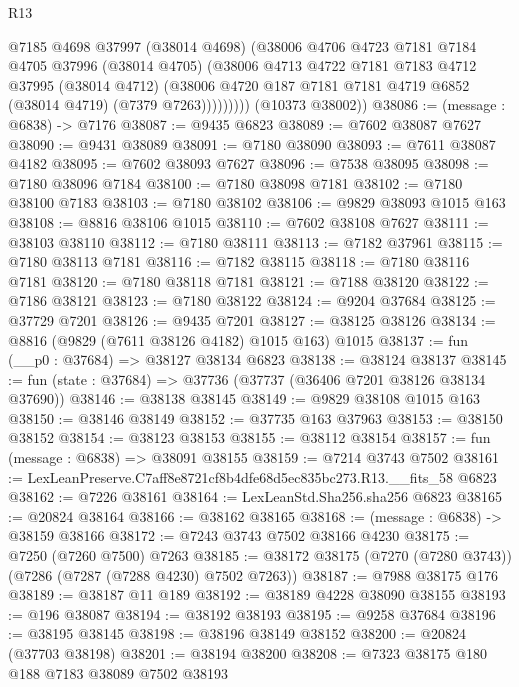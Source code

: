 \begin{lexlean}{R13}
\begin{coremodule}
                @7185
                @4698
                @37997
                (@38014 @4698)
                (@38006
                  @4706
                  @4723
                  @7181
                  @7184
                  @4705
                  @37996
                  (@38014 @4705)
                  (@38006
                    @4713
                    @4722
                    @7181
                    @7183
                    @4712
                    @37995
                    (@38014 @4712)
                    (@38006 @4720 @187 @7181 @7181 @4719 @6852 (@38014 @4719) (@7379 @7263)))))))))
      (@10373 @38002))
@38086 := (message : @6838) -> @7176
@38087 := @9435 @6823
@38089 := @7602 @38087 @7627
@38090 := @9431 @38089
@38091 := @7180 @38090
@38093 := @7611 @38087 @4182
@38095 := @7602 @38093 @7627
@38096 := @7538 @38095
@38098 := @7180 @38096 @7184
@38100 := @7180 @38098 @7181
@38102 := @7180 @38100 @7183
@38103 := @7180 @38102
@38106 := @9829 @38093 @1015 @163
@38108 := @8816 @38106 @1015
@38110 := @7602 @38108 @7627
@38111 := @38103 @38110
@38112 := @7180 @38111
@38113 := @7182 @37961
@38115 := @7180 @38113 @7181
@38116 := @7182 @38115
@38118 := @7180 @38116 @7181
@38120 := @7180 @38118 @7181
@38121 := @7188 @38120
@38122 := @7186 @38121
@38123 := @7180 @38122
@38124 := @9204 @37684
@38125 := @37729 @7201
@38126 := @9435 @7201
@38127 := @38125 @38126
@38134 := @8816 (@9829 (@7611 @38126 @4182) @1015 @163) @1015
@38137 := fun (__p0 : @37684) => @38127 @38134 @6823
@38138 := @38124 @38137
@38145 := fun (state : @37684) => @37736 (@37737 (@36406 @7201 @38126 @38134 @37690))
@38146 := @38138 @38145
@38149 := @9829 @38108 @1015 @163
@38150 := @38146 @38149
@38152 := @37735 @163 @37963
@38153 := @38150 @38152
@38154 := @38123 @38153
@38155 := @38112 @38154
@38157 := fun (message : @6838) => @38091 @38155
@38159 := @7214 @3743 @7502
@38161 := LexLeanPreserve.C7aff8e8721cf8b4dfe68d5ec835bc273.R13.__fits_58 @6823
@38162 := @7226 @38161
@38164 := LexLeanStd.Sha256.sha256 @6823
@38165 := @20824 @38164
@38166 := @38162 @38165
@38168 := (message : @6838) -> @38159 @38166
@38172 := @7243 @3743 @7502 @38166 @4230
@38175 := @7250 (@7260 @7500) @7263
@38185 := @38172 @38175 (@7270 (@7280 @3743)) (@7286 (@7287 (@7288 @4230) @7502 @7263))
@38187 := @7988 @38175 @176
@38189 := @38187 @11 @189
@38192 := @38189 @4228 @38090 @38155
@38193 := @196 @38087
@38194 := @38192 @38193
@38195 := @9258 @37684
@38196 := @38195 @38145
@38198 := @38196 @38149 @38152
@38200 := @20824 (@37703 @38198)
@38201 := @38194 @38200
@38208 := @7323 @38175 @180 @188 @7183 @38089 @7502 @38193

\end{coremodule}
\end{lexlean}
